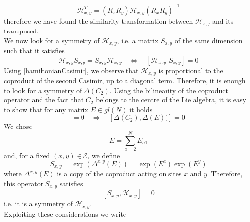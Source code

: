 \documentclass[10pt]{article}
\numberwithin{equation}{section}
\numberwithin{equation}{subsection}
\begin{document}
\begin{equation}\label{transpositionPropertyH}
    \mathcal{H}_{x,y}^{T}=\left(R_{x}R_{y}\right)\mathcal{H}_{x,y}\left(R_{x}R_{y}\right)^{-1}
\end{equation}
therefore we have found the similarity transformation between $\mathcal{H}_{x,y}$ and its transposed. \\
We now look for a symmetry of $\mathcal{H}_{x,y}$, i.e. a matrix $S_{x,y}$ of the same dimension such that it satisfies 
\begin{equation}
	\mathcal{H}_{x,y}S_{x,y}=S_{x,y}\mathcal{H}_{x,y}\quad \Leftrightarrow \quad [\mathcal{H}_{x,y},S_{x,y}]=0
\end{equation}
Using \eqref{hamiltonianCasimir}, we observe that $\mathcal{H}_{x,y}$ is proportional to the coproduct of the second Casimir, up to a diagonal term. Therefore, it is enough to look for a symmetry of $\Delta (C_{2})$. Using the bilinearity of the coproduct operator and the fact that $C_{2}$ belongs to the centre of the Lie algebra, it is easy to show that for any matrix $E\in gl(N)$ it holds
\begin{equation}
	[C_{2},E]=0\quad \Rightarrow\quad \left[\Delta (C_{2}),\Delta(E)) \right]=0
\end{equation}
We chose 
\begin{equation}
	E=\sum_{a=2}^{N}E_{a1}
\end{equation}
and, for a fixed $(x,y)\in \mathcal{E}$, we define
\begin{equation}
	S_{x,y}=\exp{(\Delta^{x,y}(E))}=\exp{(E^{x})}\exp{(E^{y})}
\end{equation}
where $\Delta^{x,y}(E)$ is a copy of the coproduct acting on sites $x$ and $y$. Therefore, this operator $S_{x,y}$ satisfies
\begin{equation}\label{symmetryH}
	\left[S_{x,y},\mathcal{H}_{x,y}\right]=0
\end{equation}
i.e. it is a symmetry of $\mathcal{H}_{x,y}$. \\ Exploiting these considerations we write
\end{document}
